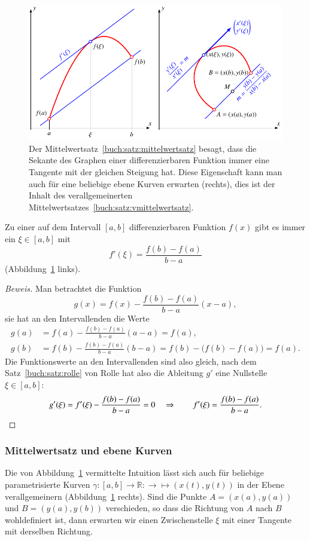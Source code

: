 \begin{figure}
\centering
\includegraphics{chapters/30-interpolation/figures/mittelwertsatz.pdf}
\caption{Der Mittelwertsatz~\ref{buch:satz:mittelwertsatz} besagt, dass
die Sekante des Graphen einer differenzierbaren Funktion immer eine
Tangente mit der gleichen Steigung hat.
Diese Eigenschaft kann man auch für eine beliebige ebene Kurven
erwarten (rechts), dies ist der Inhalt des verallgemeinerten
Mittelwertsatzes~\ref{buch:satz:vmittelwertsatz}.
\label{buch:polynome:figure:mittelwertsatz}}
\end{figure}

\begin{satz}[Mittelwertsatz]
\label{buch:satz:mittelwertsatz}
Zu einer auf dem Intervall $[a,b]$ differenzierbaren Funktion $f(x)$ gibt
es immer ein $\xi\in[a,b]$ mit
\[
f'(\xi) = \frac{f(b)-f(a)}{b-a}
\]
(Abbildung~\ref{buch:polynome:figure:mittelwertsatz} links).
\end{satz}

\begin{proof}[Beweis]
Man betrachtet die Funktion 
\[
g(x) = f(x) - \frac{f(b)-f(a)}{b-a}(x-a),
\]
sie hat an den Intervallenden die Werte
\begin{align*}
g(a) &= f(a) - \frac{f(b)-f(a)}{b-a}(a-a)=f(a),
\\
g(b) &= f(b) - \frac{f(b)-f(a)}{b-a}(b-a) = f(b) - \bigl(f(b)-f(a)\bigr) = f(a).
\end{align*}
Die Funktionswerte an den Intervallenden sind also gleich,
nach dem Satz~\ref{buch:satz:rolle} von Rolle hat also
die Ableitung $g'$ eine Nullstelle $\xi\in[a,b]$:
\[
g'(\xi) = f'(\xi) - \frac{f(b)-f(a)}{b-a} = 0
\quad
\Rightarrow
\qquad
f'(\xi) = \frac{f(b)-f(a)}{b-a}.
\qedhere
\]
\end{proof}

\subsubsection{Mittelwertsatz und ebene Kurven}
Die von Abbildung~\ref{buch:polynome:figure:mittelwertsatz} vermittelte
Intuition lässt sich auch für beliebige parametrisierte Kurven
$\gamma\colon[a,b]\to\mathbb R:\to\mapsto (x(t),y(t))$ in der Ebene
verallgemeinern (Abbildung~\ref{buch:polynome:figure:mittelwertsatz} rechts).
Sind die Punkte $A=(x(a),y(a))$ und $B=(y(a),y(b))$ verschieden,
so dass die Richtung von $A$ nach $B$ wohldefiniert ist, dann erwarten
wir einen Zwischenstelle $\xi$ mit einer Tangente mit derselben Richtung.

